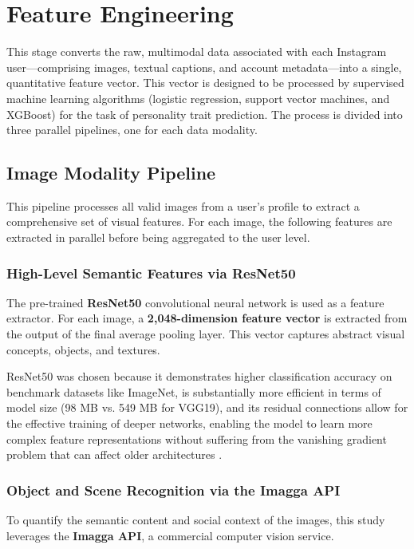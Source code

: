 

\section{Feature Engineering}
\label{subsec:features}
This stage converts the raw, multimodal data associated with each Instagram user—comprising images, textual captions, and account metadata—into a single, quantitative feature vector. This vector is designed to be processed by supervised machine learning algorithms (logistic regression, support vector machines, and XGBoost) for the task of personality trait prediction. The process is divided into three parallel pipelines, one for each data modality.

\subsection{Image Modality Pipeline}
This pipeline processes all valid images from a user's profile to extract a comprehensive set of visual features. For each image, the following features are extracted in parallel before being aggregated to the user level.

\subsubsection{High-Level Semantic Features via ResNet50}
The pre-trained \textbf{ResNet50} convolutional neural network is used as a feature extractor. For each image, a \textbf{2,048-dimension feature vector} is extracted from the output of the final average pooling layer. This vector captures abstract visual concepts, objects, and textures.

ResNet50 was chosen because it demonstrates higher classification accuracy on benchmark datasets like ImageNet, is substantially more efficient in terms of model size (98 MB vs. 549 MB for VGG19), and its residual connections allow for the effective training of deeper networks, enabling the model to learn more complex feature representations without suffering from the vanishing gradient problem that can affect older architectures \citep{he2015, simonyan2014very}.

\subsubsection{Object and Scene Recognition via the Imagga API}
To quantify the semantic content and social context of the images, this study leverages the \textbf{Imagga API}, a commercial computer vision service.


